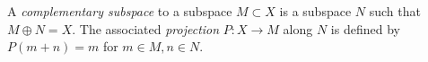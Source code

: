 A \emph{complementary subspace} to a subspace $M \subset X$ is a subspace $N$ such that $M \oplus N = X$. The associated \emph{projection} $P: X \to M$ along $N$ is defined by $P(m+n) = m$ for $m \in M, n \in N$.
